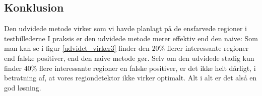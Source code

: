 \subsection{Konklusion}
Den udvidede metode virker som vi havde planlagt på de ensfarvede
regioner i testbillederne I praksis er den udvidede metode merer
effektiv end den naive: Som man kan se i figur \ref{udvidet_virker3} finder
den $20 \%$ flerer interessante regioner end falske positiver, end den
naive metode gør. Selv om den udvidede stadig kun finder $40\%$ flere
interessante regioner en falske positiver, er det ikke helt dårligt, i
betratning af, at vores regiondetektor ikke virker optimalt. Alt i alt
er det alså en god løsning.
